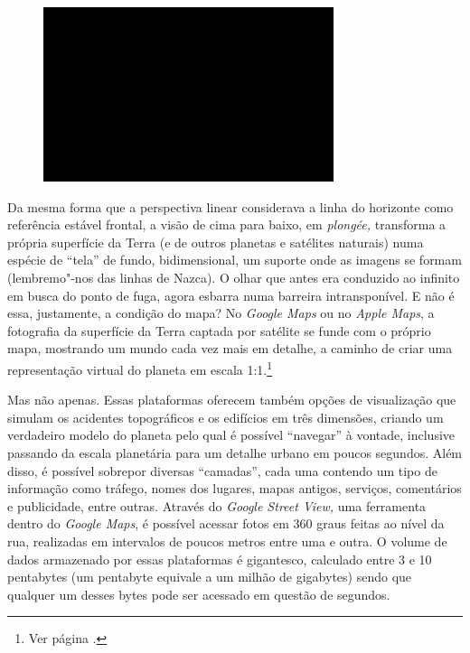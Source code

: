 \begin{figure}[!ht]

\centering
 \includegraphics[width=85mm]{./imgs/im1.jpg}
\caption{\tiny{}}

\end{figure}

Da mesma forma que a perspectiva linear considerava a linha do horizonte
como referência estável frontal, a visão de cima para baixo, em
\emph{plongée,} transforma a própria superfície da Terra (e de outros
planetas e satélites naturais) numa espécie de ``tela'' de fundo,
bidimensional, um suporte onde as imagens se formam (lembremo"-nos das
linhas de Nazca). O olhar que antes era conduzido ao infinito em busca
do ponto de fuga, agora esbarra numa barreira intransponível. E não é
essa, justamente, a condição do mapa? No \emph{Google Maps} ou no
\emph{Apple Maps}, a fotografia da superfície da Terra captada por
satélite se funde com o próprio mapa, mostrando um mundo cada vez mais
em detalhe, a caminho de criar uma representação virtual do planeta em
escala 1:1.\footnote{Ver página .}

Mas não apenas. Essas plataformas oferecem também opções de visualização
que simulam os acidentes topográficos e os edifícios em três dimensões,
criando um verdadeiro modelo do planeta pelo qual é possível ``navegar''
à vontade, inclusive passando da escala planetária para um detalhe
urbano em poucos segundos. Além disso, é possível sobrepor diversas
``camadas'', cada uma contendo um tipo de informação como tráfego, nomes
dos lugares, mapas antigos, serviços, comentários e publicidade, entre
outras. Através do \emph{Google Street View,} uma ferramenta dentro do
\emph{Google Maps}, é possível acessar fotos em 360 graus feitas ao
nível da rua, realizadas em intervalos de poucos metros entre uma e
outra. O volume de dados armazenado por essas plataformas é gigantesco,
calculado entre 3 e 10 pentabytes (um pentabyte equivale a um milhão de
gigabytes) sendo que qualquer um desses bytes pode ser acessado em
questão de segundos.

